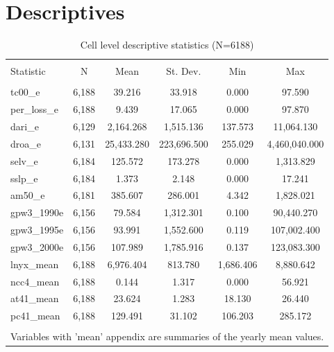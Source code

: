\documentclass{article}\usepackage[]{graphicx}\usepackage[]{color}
\newenvironment{knitrout}{}{}  %
\begin{document}
\begin{knitrout}
\section{Descriptives}


\begin{table}[!htbp] \centering 
  \caption{Cell level descriptive statistics (N=6188)} 
  \label{} 
\begin{tabular}{@{\extracolsep{5pt}}lccccc} 
\\[-1.8ex]\hline 
\hline \\[-1.8ex] 
Statistic & \multicolumn{1}{c}{N} & \multicolumn{1}{c}{Mean} & \multicolumn{1}{c}{St. Dev.} & \multicolumn{1}{c}{Min} & \multicolumn{1}{c}{Max} \\ 
\hline \\[-1.8ex] 
tc00\_e & 6,188 & 39.216 & 33.918 & 0.000 & 97.590 \\ 
per\_loss\_e & 6,188 & 9.439 & 17.065 & 0.000 & 97.870 \\ 
dari\_e & 6,129 & 2,164.268 & 1,515.136 & 137.573 & 11,064.130 \\ 
droa\_e & 6,131 & 25,433.280 & 223,696.500 & 255.029 & 4,460,040.000 \\ 
selv\_e & 6,184 & 125.572 & 173.278 & 0.000 & 1,313.829 \\ 
sslp\_e & 6,184 & 1.373 & 2.148 & 0.000 & 17.241 \\ 
am50\_e & 6,181 & 385.607 & 286.001 & 4.342 & 1,828.021 \\ 
gpw3\_1990e & 6,156 & 79.584 & 1,312.301 & 0.100 & 90,440.270 \\ 
gpw3\_1995e & 6,156 & 93.991 & 1,552.600 & 0.119 & 107,002.400 \\ 
gpw3\_2000e & 6,156 & 107.989 & 1,785.916 & 0.137 & 123,083.300 \\ 
lnyx\_mean & 6,188 & 6,976.404 & 813.780 & 1,686.406 & 8,880.642 \\ 
ncc4\_mean & 6,188 & 0.144 & 1.317 & 0.000 & 56.921 \\ 
at41\_mean & 6,188 & 23.624 & 1.283 & 18.130 & 26.440 \\ 
pc41\_mean & 6,188 & 129.491 & 31.102 & 106.203 & 285.172 \\ 
\hline \\[-1.8ex] 
\multicolumn{6}{l}{Variables with 'mean' appendix are summaries of the yearly mean values.} \\ 
\end{tabular} 
\end{table} 



\end{knitrout}
\end{document}
